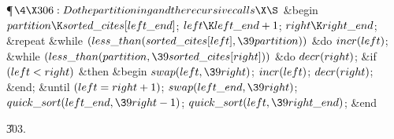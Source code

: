 \Y\P$\4\X306:Do the partitioning and the recursive calls\X\S$\6
\&{begin} $\\{partition}\K\\{sorted\_cites}[\\{left\_end}]$;\5
$\\{left}\K\\{left\_end}+1$;\5
$\\{right}\K\\{right\_end}$;\6
\1\&{repeat} \&{while} $(\\{less\_than}(\\{sorted\_cites}[\\{left}],\39%
\\{partition}))$ \1\&{do}\5
$\\{incr}(\\{left})$;\2\6
\&{while} $(\\{less\_than}(\\{partition},\39\\{sorted\_cites}[\\{right}]))$ \1%
\&{do}\5
$\\{decr}(\\{right})$;\2\6
\&{if} $(\\{left}<\\{right})$ \1\&{then}\6
\&{begin} $\\{swap}(\\{left},\39\\{right})$;\5
$\\{incr}(\\{left})$;\5
$\\{decr}(\\{right})$;\6
\&{end};\2\6
\4\&{until}\5
$(\\{left}=\\{right}+1)$;\2\6
$\\{swap}(\\{left\_end},\39\\{right})$;\6
$\\{quick\_sort}(\\{left\_end},\39\\{right}-1)$;\5
$\\{quick\_sort}(\\{left},\39\\{right\_end})$;\6
\&{end}\par
\U303.\fi

